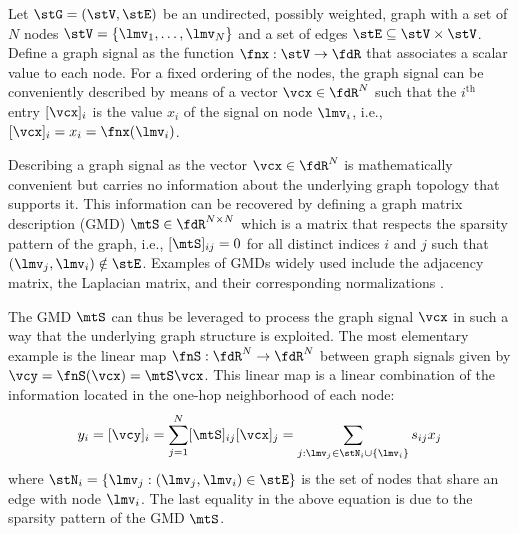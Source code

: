 

Let $\stG = (\stV, \stE)$ be an undirected, possibly weighted, graph with a set of $N$ nodes $\stV = \{\lmv_{1},\ldots,\lmv_{N}\}$ and a set of edges $\stE \subseteq \stV \times \stV$. Define a graph signal as the function $\fnx: \stV \to \fdR$ that associates a scalar value to each node. For a fixed ordering of the nodes, the graph signal can be conveniently described by means of a vector $\vcx \in \fdR^{N}$ such that the $i^{\text{th}}$ entry $[\vcx]_{i}$ is the value $x_{i}$ of the signal on node $\lmv_{i}$, i.e., $[\vcx]_{i} = x_{i} = \fnx(\lmv_{i})$. %

Describing a graph signal as the vector $\vcx \in \fdR^{N}$ is mathematically convenient but carries no information about the underlying graph topology that supports it. This information can be recovered by defining a graph matrix description (GMD) $\mtS \in \fdR^{N \times N}$ which is a matrix that respects the sparsity pattern of the graph, i.e., $[\mtS]_{ij} = 0$ for all distinct indices $i$ and $j$ such that $(\lmv_{j},\lmv_{i}) \notin \stE$. Examples of GMDs widely used include the adjacency matrix, the Laplacian matrix, and their corresponding normalizations \cite{Sandryhaila2013-DSPG, Shuman2013-SPG, Ortega2018-GSP}.

The GMD $\mtS$ can thus be leveraged to process the graph signal $\vcx$ in such a way that the underlying graph structure is exploited. The most elementary example is the linear map $\fnS: \fdR^{N} \to \fdR^{N}$ between graph signals given by $\vcy = \fnS(\vcx) = \mtS \vcx$. This linear map is a linear combination of the information located in the one-hop neighborhood of each node:
\begin{equation} \label{eq:graphShiftSingle}
    y_{i} = [\vcy]_{i} = \sum_{j=1}^{N} [\mtS]_{ij} [\vcx]_{j} = \sum_{j : \lmv_{j} \in \stN_{i} \cup \{\lmv_{i}\}} s_{ij}x_{j}
\end{equation}
%
where $\stN_{i} = \{\lmv_{j}: (\lmv_{j},\lmv_{i}) \in \stE \}$ is the set of nodes that share an edge with node $\lmv_{i}$. The last equality in the above equation is due to the sparsity pattern of the GMD $\mtS$.%

